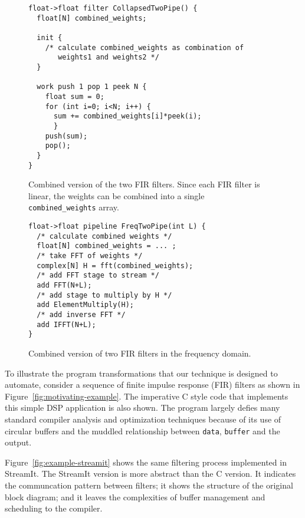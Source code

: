 \begin{figure}
\scriptsize
\begin{verbatim}
float->float filter CollapsedTwoPipe() {
  float[N] combined_weights;

  init {
    /* calculate combined_weights as combination of 
       weights1 and weights2 */
  }

  work push 1 pop 1 peek N {
    float sum = 0;
    for (int i=0; i<N; i++) {
      sum += combined_weights[i]*peek(i);
      }
    push(sum);
    pop();
  }
}
\end{verbatim}
\caption{Combined version of the two FIR filters.  Since each FIR
filter is linear, the weights can be combined into a single {\tt
combined\_weights} array.}
\label{fig:example-combine}
\end{figure}

\begin{figure}
\scriptsize
\begin{verbatim}
float->float pipeline FreqTwoPipe(int L) {
  /* calculate combined weights */
  float[N] combined_weights = ... ;
  /* take FFT of weights */
  complex[N] H = fft(combined_weights);
  /* add FFT stage to stream */
  add FFT(N+L);
  /* add stage to multiply by H */
  add ElementMultiply(H);
  /* add inverse FFT */
  add IFFT(N+L);
}
\end{verbatim}
\caption{Combined version of two FIR filters in the frequency domain.}
\label{fig:example-frequency}
\end{figure}

To illustrate the program transformations that our technique is
designed to automate, consider a sequence of finite impulse response
(FIR) filters as shown in Figure~\ref{fig:motivating-example}. The
imperative C style code that implements this simple DSP application is
also shown. The program largely defies many standard compiler analysis
and optimization techniques because of its use of circular buffers and
the muddled relationship between {\tt data}, {\tt buffer} and the
output.

Figure~\ref{fig:example-streamit} shows the same filtering process
implemented in StreamIt. The StreamIt version is more abstract than
the C version.  It indicates the communcation pattern between filters;
it shows the structure of the original block diagram; and it leaves
the complexities of buffer management and scheduling to the compiler.

